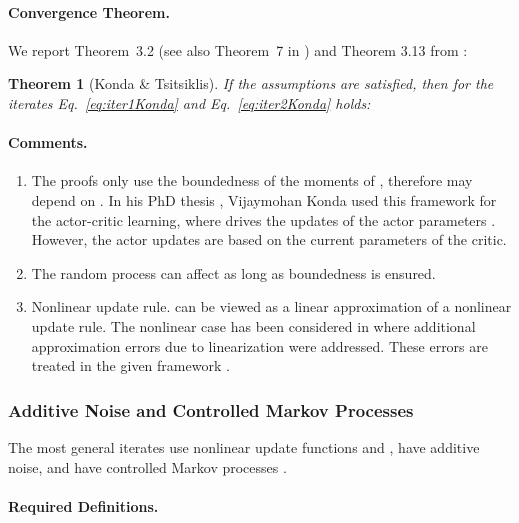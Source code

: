 \documentclass{article}
\newtheorem{theorem}{Theorem}
\begin{document}
\paragraph{Convergence Theorem.}

We report Theorem~3.2 (see also  Theorem~7 in \cite{Konda:03})
and Theorem 3.13 from \cite{Konda:02}:

\begin{theorem}[Konda \& Tsitsiklis]
\label{th:konda}
If the assumptions are satisfied,
then for the iterates Eq.~\eqref{eq:iter1Konda} and Eq.~\eqref{eq:iter2Konda}
holds:

\end{theorem}


\paragraph{Comments.}

\begin{enumerate}[label=\textbf{(C\arabic*)}]
\item
The proofs only use the boundedness of the moments of  \cite{Konda:02,Konda:03},
therefore  may depend on .
In his PhD thesis \cite{Konda:02}, Vijaymohan Konda used this framework for
the actor-critic learning, where  drives the updates of the
actor parameters .
However, the actor updates are based on the current parameters  of
the critic.
\item
The random process  can affect  as long as
boundedness is ensured.
\item Nonlinear update rule.
 can be viewed as a linear approximation of a
nonlinear update rule. The nonlinear case has been considered in
\cite{Konda:02} where additional approximation errors due to
linearization were addressed. These errors are
treated in the given framework \cite{Konda:02}.
\end{enumerate}


\subsubsection{Additive Noise and Controlled Markov Processes}
\label{sec:addnoisecmp}
The most general iterates use nonlinear update functions  and
, have additive noise,
and have controlled Markov processes \cite{Karmakar:17}.



\paragraph{Required Definitions.}
\end{document}
